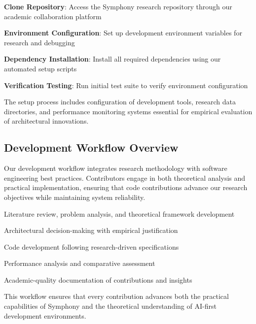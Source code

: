 \begin{expandedlist}
    \item \textbf{Clone Repository}: Access the Symphony research repository through our academic collaboration platform
    \item \textbf{Environment Configuration}: Set up development environment variables for research and debugging
    \item \textbf{Dependency Installation}: Install all required dependencies using our automated setup scripts
    \item \textbf{Verification Testing}: Run initial test suite to verify environment configuration
\end{expandedlist}

The setup process includes configuration of development tools, research data directories, and performance monitoring systems essential for empirical evaluation of architectural innovations.

\subsection*{Development Workflow Overview}

Our development workflow integrates research methodology with software engineering best practices. Contributors engage in both theoretical analysis and practical implementation, ensuring that code contributions advance our research objectives while maintaining system reliability.

\begin{description}[leftmargin=3cm,labelwidth=2.5cm]
    \item[\textbf{Research Phase}] Literature review, problem analysis, and theoretical framework development
    \item[\textbf{Design Phase}] Architectural decision-making with empirical justification
    \item[\textbf{Implementation}] Code development following research-driven specifications
    \item[\textbf{Evaluation}] Performance analysis and comparative assessment
    \item[\textbf{Documentation}] Academic-quality documentation of contributions and insights
\end{description}

This workflow ensures that every contribution advances both the practical capabilities of Symphony and the theoretical understanding of AI-first development environments.
